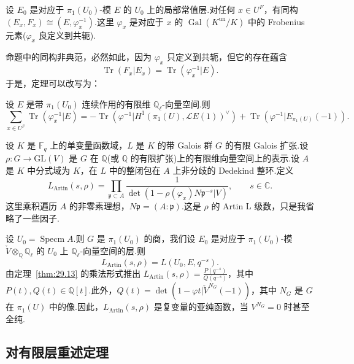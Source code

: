\begin{proposition}\label{prop:29.12}
设 $E_0$ 是对应于 $\pi_1(U_0)$-模 $E$ 的 $U_0$ 上的局部常值层.对任何 $x \in U^{F}$，有同构 $(E_x, F_x) \cong (E, \varphi^{-1}_x)$.这里 $\varphi_x$ 是对应于 $x$ 的 $\operatorname{Gal}(K^{\mathrm{un}}/K)$ 中的 Frobenius 元素($\varphi_x$ 良定义到共轭).
\end{proposition}

命题中的同构非典范，必然如此，因为 $\varphi_x$ 只定义到共轭，但它的存在蕴含
\[
\operatorname{Tr}(F_x|E_x) = \operatorname{Tr}(\varphi^{-1}_x|E).
\]
于是，定理可以改写为：

\begin{theorem}\label{thm:29.13}
设 $E$ 是带 $\pi_1(U_0)$ 连续作用的有限维 $\mathbb{Q}_{\ell}$-向量空间.则
\[
\sum_{x \in U^{F}} \operatorname{Tr}(\varphi^{-1}_x|E) = -\operatorname{Tr}(\varphi^{-1}|H^{1}(\pi_1(U), \mathcal{L}E(1))^{\vee}) + \operatorname{Tr}(\varphi^{-1}|E_{\pi_1(U)}(-1)).
\]
\end{theorem}

\begin{example}\label{ex:29.14}
设 $K$ 是 $\mathbb{F}_q$ 上的单变量函数域，$L$ 是 $K$ 的带 Galois 群 $G$ 的有限 Galois 扩张.设 $\rho \colon G \to \mathrm{GL}(V)$ 是 $G$ 在 $\mathbb{Q}$(或 $\mathbb{Q}$ 的有限扩张)上的有限维向量空间上的表示.设 $A$ 是 $K$ 中分式域为 $K$，在 $L$ 中的整闭包在 $A$ 上非分歧的 Dedekind 整环.定义
\[
L_{\mathrm{Artin}}(s, \rho) = \prod_{\mathfrak{p} \subset A} \frac{1}{\det(1 - \rho(\varphi_x)N\mathfrak{p}^{-s}|V)}, \qquad s \in \mathbb{C}.
\]
这里乘积遍历 $A$ 的非零素理想，$N\mathfrak{p} = (A \colon \mathfrak{p})$.这是 $\rho$ 的 Artin L 级数，只是我省略了一些因子.

设 $U_0 = \operatorname{Specm} A$.则 $G$ 是 $\pi_1(U_0)$ 的商，我们设 $E_0$ 是对应于 $\pi_1(U_0)$-模 $\check{V} \otimes_{\mathbb{Q}} \mathbb{Q}_{\ell}$ 的 $U_0$ 上 $\mathbb{Q}_{\ell}$-向量空间的层.则
\[
L_{\mathrm{Artin}}(s, \rho) = L(U_0, E, q^{-s}).
\]
由定理~\ref{thm:29.13} 的乘法形式推出 $L_{\mathrm{Artin}}(s, \rho) = \frac{P(q^{-s})}{Q(q^{-s})}$，其中 $P(t), Q(t) \in \mathbb{Q}[t]$.此外，$Q(t) = \det(1 - \varphi t|\check{V}^{N_{G}}(-1))$，其中 $N_{G}$ 是 $G$ 在 $\pi_1(U)$ 中的像.因此，$L_{\mathrm{Artin}}(s, \rho)$ 是复变量的亚纯函数，当 $V^{N_{G}} = 0$ 时甚至全纯.
\end{example}

\subsection*{对有限层重述定理}


